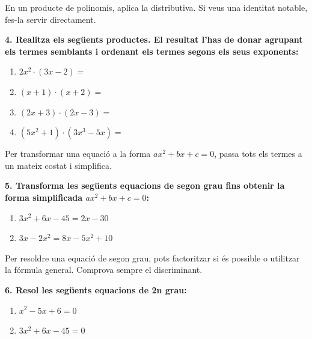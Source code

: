 \documentclass[12pt,a4paper]{article}
\begin{document}
\begin{capsula}
En un producte de polinomis, aplica la distributiva. Si veus una identitat notable, fes-la servir directament.
\end{capsula}

\textbf{4. Realitza els següents productes. El resultat l’has de donar agrupant els termes semblants i ordenant els termes segons els seus exponents:}
\begin{enumerate}[label=\alph*)]
    \item $2x^2\cdot(3x-2) =$ \vspace{0.8cm}
    \item $(x+1)\cdot(x+2) =$ \vspace{0.8cm}
    \item $(2x+3)\cdot(2x-3) =$ \vspace{0.8cm}
    \item $(5x^2+1)\cdot(3x^3-5x) =$ \vspace{1cm}
\end{enumerate}

\begin{capsula}
Per transformar una equació a la forma $ax^2+bx+c=0$, passa tots els termes a un mateix costat i simplifica.
\end{capsula}

\textbf{5. Transforma les següents equacions de segon grau fins obtenir la forma simplificada $ax^2+bx+c=0$:}
\begin{enumerate}[label=\alph*)]
    \item $3x^2+6x-45=2x-30$ \vspace{1cm}
    \item $3x-2x^2=8x-5x^2+10$ \vspace{1cm}
\end{enumerate}

\begin{capsula}
Per resoldre una equació de segon grau, pots factoritzar si és possible o utilitzar la fórmula general. Comprova sempre el discriminant.
\end{capsula}

\textbf{6. Resol les següents equacions de 2n grau:}
\begin{enumerate}[label=\alph*)]
    \item $x^2-5x+6=0$ \vspace{1cm}
    \item $3x^2+6x-45=0$ \vspace{1cm}
\end{enumerate}
\end{document}
